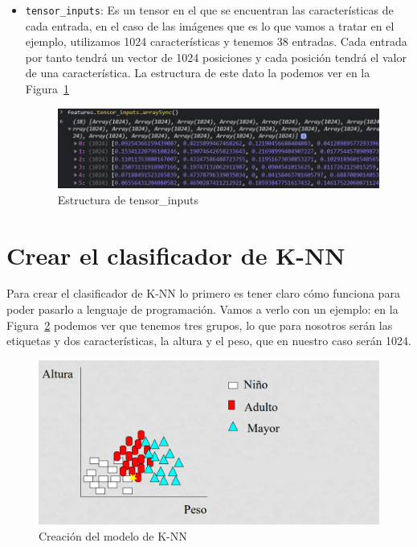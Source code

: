 \documentclass[a4paper, 12pt]{book}
\begin{document}
\begin{itemize}
	\item \texttt{tensor\_inputs}: Es un tensor en el que se encuentran las características de cada entrada, en el caso de las imágenes que es lo que vamos a tratar en el ejemplo, utilizamos 1024 características y tenemos 38 entradas. Cada entrada por tanto tendrá un vector de 1024 posiciones y cada posición tendrá el valor de una característica. La estructura de este dato la podemos ver en la Figura~\ref{fig:tensorinputs}

\begin{figure}
	\centering
	\includegraphics[width=12cm, keepaspectratio]{img/tensorinputs}
	\caption{Estructura de tensor\_inputs}				
	\label{fig:tensorinputs}
\end{figure}


\end{itemize}

\section{Crear el clasificador de K-NN} 
\label{sec:knn}

Para crear el clasificador de K-NN lo primero es tener claro cómo funciona para poder pasarlo a lenguaje de programación. Vamos a verlo con un ejemplo: en la Figura~\ref{fig:ejemploknn} podemos ver que tenemos tres grupos, lo que para nosotros serán las etiquetas y dos características, la altura y el peso, que en nuestro caso serán 1024. 

\begin{figure}
	\centering
	\includegraphics[width=12cm, keepaspectratio]{img/ejemploknn}
	\caption{Creación del modelo de K-NN}				
	\label{fig:ejemploknn}
\end{figure}
\end{document}
